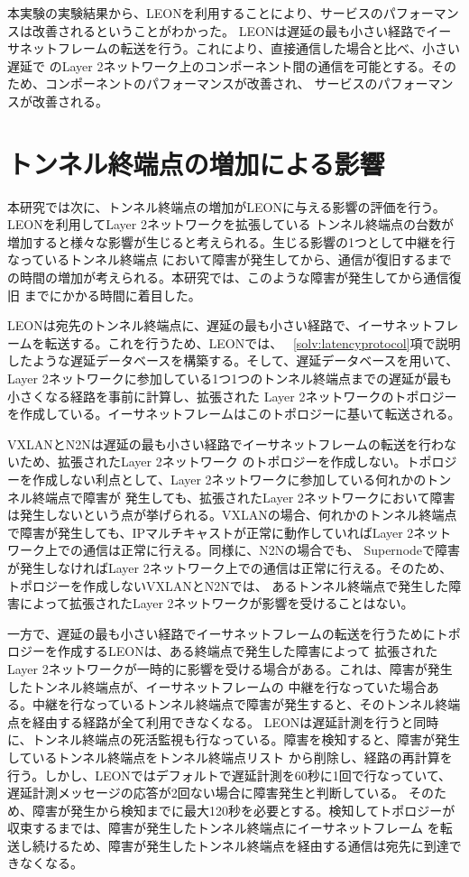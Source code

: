 本実験の実験結果から、LEONを利用することにより、サービスのパフォーマンスは改善されるということがわかった。
LEONは遅延の最も小さい経路でイーサネットフレームの転送を行う。これにより、直接通信した場合と比べ、小さい遅延で
のLayer 2ネットワーク上のコンポーネント間の通信を可能とする。そのため、コンポーネントのパフォーマンスが改善され、
サービスのパフォーマンスが改善される。

\section{トンネル終端点の増加による影響}

本研究では次に、トンネル終端点の増加がLEONに与える影響の評価を行う。LEONを利用してLayer 2ネットワークを拡張している
トンネル終端点の台数が増加すると様々な影響が生じると考えられる。生じる影響の1つとして中継を行なっているトンネル終端点
において障害が発生してから、通信が復旧するまでの時間の増加が考えられる。本研究では、このような障害が発生してから通信復旧
までにかかる時間に着目した。

LEONは宛先のトンネル終端点に、遅延の最も小さい経路で、イーサネットフレームを転送する。これを行うため、LEONでは、
~\ref{solv:latencyprotocol}項で説明したような遅延データベースを構築する。そして、遅延データベースを用いて、
Layer 2ネットワークに参加している1つ1つのトンネル終端点までの遅延が最も小さくなる経路を事前に計算し、拡張された
Layer 2ネットワークのトポロジーを作成している。イーサネットフレームはこのトポロジーに基いて転送される。

VXLANとN2Nは遅延の最も小さい経路でイーサネットフレームの転送を行わないため、拡張されたLayer 2ネットワーク
のトポロジーを作成しない。トポロジーを作成しない利点として、Layer 2ネットワークに参加している何れかのトンネル終端点で障害が
発生しても、拡張されたLayer 2ネットワークにおいて障害は発生しないという点が挙げられる。VXLANの場合、何れかのトンネル終端点
で障害が発生しても、IPマルチキャストが正常に動作していればLayer 2ネットワーク上での通信は正常に行える。同様に、N2Nの場合でも、
Supernodeで障害が発生しなければLayer 2ネットワーク上での通信は正常に行える。そのため、トポロジーを作成しないVXLANとN2Nでは、
あるトンネル終端点で発生した障害によって拡張されたLayer 2ネットワークが影響を受けることはない。

一方で、遅延の最も小さい経路でイーサネットフレームの転送を行うためにトポロジーを作成するLEONは、ある終端点で発生した障害によって
拡張されたLayer 2ネットワークが一時的に影響を受ける場合がある。これは、障害が発生したトンネル終端点が、イーサネットフレームの
中継を行なっていた場合ある。中継を行なっているトンネル終端点で障害が発生すると、そのトンネル終端点を経由する経路が全て利用できなくなる。
LEONは遅延計測を行うと同時に、トンネル終端点の死活監視も行なっている。障害を検知すると、障害が発生しているトンネル終端点をトンネル終端点リスト
から削除し、経路の再計算を行う。しかし、LEONではデフォルトで遅延計測を60秒に1回で行なっていて、遅延計測メッセージの応答が2回ない場合に障害発生と判断している。
そのため、障害が発生から検知までに最大120秒を必要とする。検知してトポロジーが収束するまでは、障害が発生したトンネル終端点にイーサネットフレーム
を転送し続けるため、障害が発生したトンネル終端点を経由する通信は宛先に到達できなくなる。

